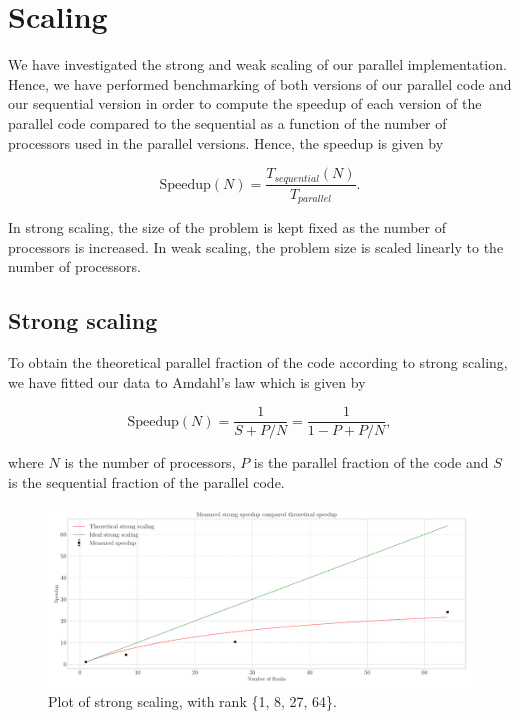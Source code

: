 \documentclass{article}
\begin{document}
\section{Scaling}

We have investigated the strong and weak scaling of our parallel implementation. Hence, we have performed benchmarking of both versions of our parallel code and our sequential version in order to compute the speedup of each version of the parallel code compared to the sequential as a function of the number of processors used in the parallel versions. Hence, the speedup is given by

\begin{equation}
    \text{Speedup}(N) = \frac{T_{sequential}(N)}{T_{parallel}}.
\end{equation}

In strong scaling, the size of the problem is kept fixed as the number of processors is increased. In weak scaling, the problem size is scaled linearly to the number of processors.

\subsection{Strong scaling}
To obtain the theoretical parallel fraction of the code according to strong scaling, we have fitted our data to Amdahl's law which is given by \autocite{robeyParallelHighPerformance2021}

\begin{equation}
    \text{Speedup}(N) = \frac{1}{S+P/N} = \frac{1}{1-P+P/N},
\end{equation}

where $N$ is the number of processors, $P$ is the parallel fraction of the code and $S$ is the sequential fraction of the parallel code.
\begin{figure}[h!]
    \centering
    \includegraphics[width=.9\textwidth]{Final_project/Report/strong_scaling.pdf}
    \caption{Plot of strong scaling, with rank \{1, 8, 27, 64\}.}
    \label{fig:strong}
\end{figure}
\end{document}
